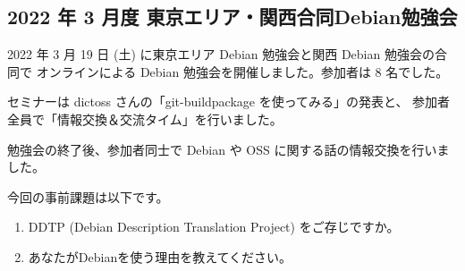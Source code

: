 \documentclass[mingoth,a4paper]{jsarticle}
\begin{document}

\subsection{2022 年 3 月度 東京エリア・関西合同Debian勉強会}

2022 年 3 月 19 日 (土) に東京エリア Debian 勉強会と関西 Debian 勉強会の合同で
オンラインによる Debian 勉強会を開催しました。参加者は 8 名でした。

セミナーは dictoss さんの「git-buildpackage を使ってみる」の発表と、
参加者全員で「情報交換＆交流タイム」を行いました。

勉強会の終了後、参加者同士で Debian や OSS に関する話の情報交換を行いました。



今回の事前課題は以下です。

\begin{enumerate}
  \item DDTP (Debian Description Translation Project) をご存じですか。
  \item あなたがDebianを使う理由を教えてください。
\end{enumerate}


\begin{multicols}{2}
{\small

}
\end{multicols}

%
%
%
%




\end{document}
